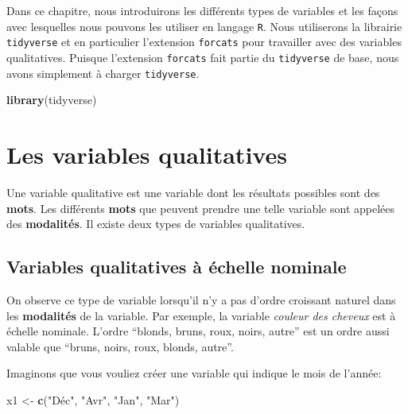 \documentclass[]{book}
\newenvironment{Shaded}{\begin{snugshade}}{\end{snugshade}}
\newcommand{\KeywordTok}[1]{\textcolor[rgb]{0.13,0.29,0.53}{\textbf{#1}}}
\newcommand{\NormalTok}[1]{#1}
\newcommand{\StringTok}[1]{\textcolor[rgb]{0.31,0.60,0.02}{#1}}
\theoremstyle{definition}
\theoremstyle{definition}
\theoremstyle{definition}
\theoremstyle{remark}
\begin{document}
Dans ce chapitre, nous introduirons les différents types de variables et
les façons avec lesquelles nous pouvons les utiliser en langage
\texttt{R}. Nous utiliserons la librairie \texttt{tidyverse} et en
particulier l'extension \texttt{forcats} pour travailler avec des
variables qualitatives. Puisque l'extension \texttt{forcats} fait partie
du \texttt{tidyverse} de base, nous avons simplement à charger
\texttt{tidyverse}.

\begin{Shaded}
\begin{Highlighting}[]
\KeywordTok{library}\NormalTok{(tidyverse)}
\end{Highlighting}
\end{Shaded}

\hypertarget{les-variables-qualitatives}{%
\section{Les variables qualitatives}\label{les-variables-qualitatives}}

Une variable qualitative est une variable dont les résultats possibles
sont des \textbf{mots}. Les différents \textbf{mots} que peuvent prendre
une telle variable sont appelées des \textbf{modalités}. Il existe deux
types de variables qualitatives.

\hypertarget{qualinominale}{%
\subsection{Variables qualitatives à échelle
nominale}\label{qualinominale}}

On observe ce type de variable lorsqu'il n'y a pas d'ordre croissant
naturel dans les \textbf{modalités} de la variable. Par exemple, la
variable \emph{couleur des cheveux} est à échelle nominale. L'ordre
``blonds, bruns, roux, noirs, autre'' est un ordre aussi valable que
``bruns, noirs, roux, blonds, autre''.

Imaginons que vous vouliez créer une variable qui indique le mois de
l'année:

\begin{Shaded}
\begin{Highlighting}[]
\NormalTok{x1 <-}\StringTok{ }\KeywordTok{c}\NormalTok{(}\StringTok{"Déc"}\NormalTok{, }\StringTok{"Avr"}\NormalTok{, }\StringTok{"Jan"}\NormalTok{, }\StringTok{"Mar"}\NormalTok{)}
\end{Highlighting}
\end{Shaded}
\end{document}
